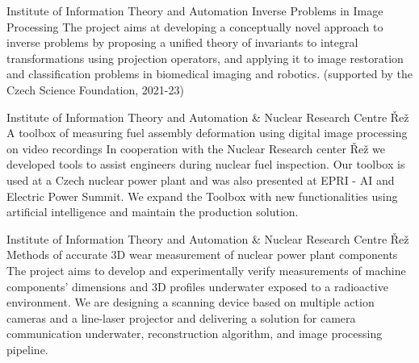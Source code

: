 


\begin{cventries}
  \cventry
    {Institute of Information Theory and Automation} %
    {Inverse Problems in Image Processing} %
    {} %
    {} %
    {
    The project aims at developing a conceptually novel approach to inverse problems by proposing a unified theory of invariants to integral transformations using projection operators, and applying it to image restoration and classification problems in biomedical imaging and robotics. (supported by the Czech Science Foundation, 2021-23) 
    }


  \cventry
    {Institute of Information Theory and Automation \& Nuclear Research Centre Řež} %
    {A toolbox of measuring fuel assembly deformation using digital image processing on video recordings} %
    {} %
    {} %
    {
    In cooperation with the Nuclear Research center Řež we developed tools to assist engineers during nuclear fuel inspection. Our toolbox is used at a Czech nuclear power plant and was also presented at EPRI - AI and Electric Power Summit. We expand the Toolbox with new functionalities using artificial intelligence and maintain the production solution.
    }


     \cventry
    {Institute of Information Theory and Automation \& Nuclear Research Centre Řež} %
    {Methods of accurate 3D wear measurement of nuclear power plant components} %
    {} %
    {} %
    {
        The project aims to develop and experimentally verify measurements of machine components' dimensions and 3D profiles underwater exposed to a radioactive environment. We are designing a scanning device based on multiple action cameras and a line-laser projector and delivering a solution for camera communication underwater, reconstruction algorithm, and image processing pipeline. 
    }
    

\end{cventries}
